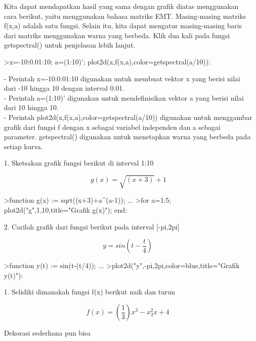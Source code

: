 \documentclass{article}
\begin{document}
\begin{eulernotebook}
\begin{eulercomment}
\begin{eulercomment}
\begin{eulercomment}
\begin{eulercomment}
\begin{eulercomment}
Kita dapat mendapatkan hasil yang sama dengan grafik diatas
menggunakan cara berikut, yaitu menggunakan bahasa matriks EMT.
Masing-masing matriks f(x,a) adalah satu fungsi. Selain itu, kita
dapat mengatur masing-masing baris dari matriks menggunakan warna yang
berbeda. Klik dua kali pada fungsi getspectral() untuk penjelasan
lebih lanjut.
\end{eulercomment}
\begin{eulerprompt}
>x=-10:0.01:10; a=(1:10)'; plot2d(x,f(x,a),color=getspectral(a/10)):
\end{eulerprompt}
\begin{eulercomment}
- Perintah x=-10:0.01:10 digunakan untuk membuat vektor x yang berisi
nilai dari -10 hingga 10 dengan interval 0.01.\\
- Perintah a=(1:10)' digunakan untuk mendefinisikan vektor a yang
berisi nilai dari 10 hingga 10.\\
- Perintah plot2d(x,f(x,a),color=getspectral(a/10)) digunakan untuk
menggambar grafik dari fungsi f dengan x sebagai variabel independen
dan a sebagai parameter. getspectral() digunakan untuk menetapkan
warna yang berbeda pada setiap kurva.

\end{eulercomment}
\begin{eulercomment}
1. Sketsakan grafik fungsi berikut di interval 1:10\\
\end{eulercomment}
\begin{eulerformula}
\[
g(x) = \sqrt{(x+3)}+1
\]
\end{eulerformula}
\begin{eulerprompt}
>function g(x) := sqrt((x+3)+a^(a-1)); ...
>for a=1:5; plot2d("g",1,10,title="Grafik g(x)"); end:
\end{eulerprompt}
\begin{eulercomment}
2. Carilah grafik dari fungsi berikut pada interval [-pi,2pi]\\
\end{eulercomment}
\begin{eulerformula}
\[
y = sin \left (t-\frac{t}{4}\right) \
\]
\end{eulerformula}
\begin{eulerprompt}
>function y(t) := sin(t-(t/4)); ...
>plot2d("y",-pi,2pi,color=blue,title="Grafik y(t)"):
\end{eulerprompt}
\begin{eulercomment}
1. Selidiki dimanakah fungsi f(x) berikut naik dan turun\\
\end{eulercomment}
\begin{eulerformula}
\[
f(x) = \left (\frac{1}{3}\right)x^3-x^2_3x+4 \
\]
\end{eulerformula}
\begin{eulercomment}
Dekorasi sederhana pun bisa


\end{eulercomment}
\end{eulercomment}
\end{eulercomment}
\end{eulercomment}
\end{eulercomment}
\end{eulernotebook}
\end{document}
